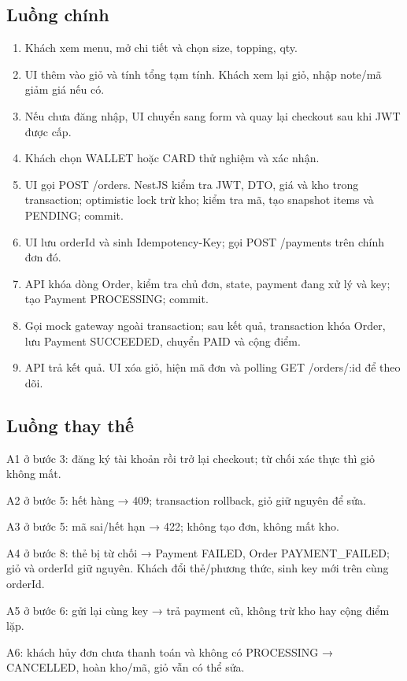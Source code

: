 \documentclass[a4paper,12pt,oneside]{report}
\begin{document}
\subsection{Luồng chính}
\begin{enumerate}
\item Khách xem menu, mở chi tiết và chọn size, topping, qty.
\item UI thêm vào giỏ và tính tổng tạm tính. Khách xem lại giỏ, nhập note/\allowbreak{}mã giảm giá nếu có.
\item Nếu chưa đăng nhập, UI chuyển sang form và quay lại checkout sau khi JWT được cấp.
\item Khách chọn WALLET hoặc CARD thử nghiệm và xác nhận.
\item UI gọi POST /\allowbreak{}orders. NestJS kiểm tra JWT, DTO, giá và kho trong transaction; optimistic lock trừ kho; kiểm tra mã, tạo snapshot items và PENDING; commit.
\item UI lưu orderId và sinh Idempotency-Key; gọi POST /\allowbreak{}payments trên chính đơn đó.
\item API khóa dòng Order, kiểm tra chủ đơn, state, payment đang xử lý và key; tạo Payment PROCESSING; commit.
\item Gọi mock gateway ngoài transaction; sau kết quả, transaction khóa Order, lưu Payment SUCCEEDED, chuyển PAID và cộng điểm.
\item API trả kết quả. UI xóa giỏ, hiện mã đơn và polling GET /\allowbreak{}orders/\allowbreak{}:id để theo dõi.
\end{enumerate}

\subsection{Luồng thay thế}
A1 ở bước 3: đăng ký tài khoản rồi trở lại checkout; từ chối xác thực thì giỏ không mất.

A2 ở bước 5: hết hàng → 409; transaction rollback, giỏ giữ nguyên để sửa.

A3 ở bước 5: mã sai/\allowbreak{}hết hạn → 422; không tạo đơn, không mất kho.

A4 ở bước 8: thẻ bị từ chối → Payment FAILED, Order PAYMENT\_FAILED; giỏ và orderId giữ nguyên. Khách đổi thẻ/\allowbreak{}phương thức, sinh key mới trên cùng orderId.

A5 ở bước 6: gửi lại cùng key → trả payment cũ, không trừ kho hay cộng điểm lặp.

A6: khách hủy đơn chưa thanh toán và không có PROCESSING → CANCELLED, hoàn kho/\allowbreak{}mã, giỏ vẫn có thể sửa.
\end{document}
